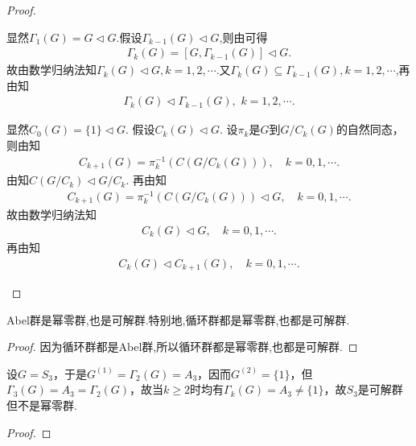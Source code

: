 \documentclass[../../main.tex]{subfiles}%
\begin{document}
\begin{proof}
\begin{enumerate}[(1)]
显然$\Gamma_1(G)=G\lhd G$.假设$\Gamma_{k-1}(G)\lhd G$,则由可得
\begin{align*}
\Gamma_k(G)=[G,\Gamma_{k-1}(G)]\lhd  G.
\end{align*}
故由数学归纳法知$\Gamma_k(G)\lhd G,k=1,2,\cdots.$又$\Gamma_k(G)\subseteq \Gamma_{k-1}(G),k=1,2,\cdots$,再由知
\begin{align*}
\Gamma_k(G)\lhd \Gamma_{k-1}(G),\,\,k=1,2,\cdots.
\end{align*}

显然$C_0(G) = \{1\} \lhd G$. 假设$C_k(G) \lhd G$. 设$\pi_k$是$G$到$G/C_k(G)$的自然同态，则由知
\begin{align*}
C_{k+1}(G) = \pi_k^{-1}\left(C\left(G/C_k(G)\right)\right),\quad k=0,1,\cdots.
\end{align*}
由知$C(G/C_k) \lhd G/C_k$. 再由知
\begin{align*}
C_{k+1}(G) = \pi_k^{-1}\left(C\left(G/C_k(G)\right)\right) \lhd G,\quad k=0,1,\cdots.
\end{align*}
故由数学归纳法知
\begin{align*}
C_k(G) \lhd G,\quad k=0,1,\cdots.
\end{align*}
再由知
\begin{align*}
C_k(G) \lhd C_{k+1}(G),\quad k=0,1,\cdots.
\end{align*}

\end{enumerate}
\end{proof}

\begin{proposition}\label{proposition:Abel群都是幂零群也都是可解群}
Abel群是幂零群,也是可解群.特别地,循环群都是幂零群,也都是可解群.
\end{proposition}
\begin{proof}
因为循环群都是Abel群,所以循环群都是幂零群,也都是可解群.
\end{proof}

\begin{example}
设$G = S_3$，于是$G^{(1)} = \Gamma_2(G) = A_3$，因而$G^{(2)} = \{1\}$，但$\Gamma_3(G) = A_3 = \Gamma_2(G)$，故当$k \geqslant 2$时均有$\Gamma_k(G) = A_3 \neq \{1\}$，故$S_3$是可解群但不是幂零群.
\end{example}
\begin{proof}

\end{proof}
\end{document}
